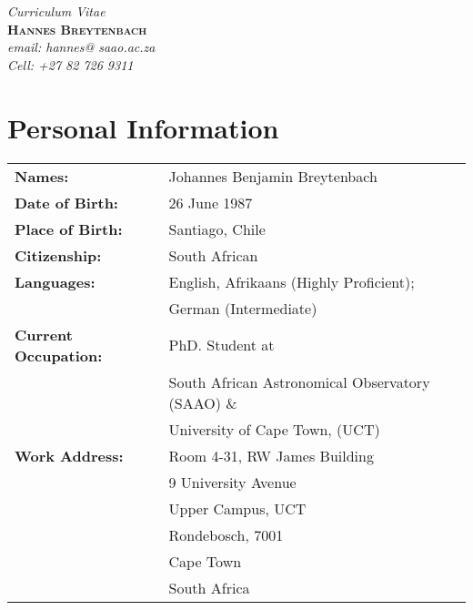 \documentclass{article}
\begin{document}
 
\thispagestyle{empty} %

\begin{center}
  \large\emph{Curriculum Vitae}\\
  \vspace{0.4cm}
  \huge \textbf{\textsc{Hannes Breytenbach}}\\
  \vspace{0.2cm}
  \normalsize
  \emph{email: hannes@ saao.ac.za}\\
  \emph{Cell: +27 82 726 9311}\\

\end{center}

\section*{Personal Information}
\begin{tabular}[h!]{l l} 
  \textbf{Names:}		& Johannes Benjamin Breytenbach\\
  \textbf{Date of Birth:}	& 26 June 1987	\\
  \textbf{Place of Birth:}	& Santiago, Chile\\
  \textbf{Citizenship:}		& South African\\
  \textbf{Languages:}		& English, Afrikaans (Highly Proficient); \\
				& German (Intermediate) \\
  \textbf{Current Occupation:}	& PhD. Student at\\&\hspace{0.5cm} South African Astronomical Observatory (SAAO) \& \\&\hspace{0.5cm} University of Cape Town, (UCT)\\
  \textbf{Work Address:}	& Room 4-31, RW James Building \\&9 University Avenue \\&Upper Campus, UCT %
				  \\&Rondebosch, 7001 \\&Cape Town \\&South Africa
\end{tabular}
\end{document}
